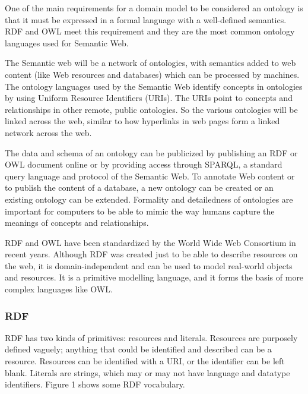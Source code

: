 \documentclass[10pt,journal,compsoc]{IEEEtran}
\begin{document}
One of the main requirements for a domain model to be considered an ontology is that it must be expressed in a formal language with a well-defined semantics.  RDF and OWL meet this requirement and they are the most common ontology languages used for Semantic Web.  

The Semantic web will be a network of ontologies, with semantics added to web content (like Web resources and databases) which can be processed by machines.  The ontology languages  used by the Semantic Web identify concepts in ontologies by using Uniform Resource Identifiers (URIs).  The URIs point to concepts and relationships in other remote, public ontologies.  So the various ontologies will be linked across the web, similar to how hyperlinks in web pages form a linked network across the web.

The data and schema of an ontology can be publicized by publishing an RDF or OWL document online or by providing access through SPARQL, a standard query language and protocol of the Semantic Web.  To annotate Web content or to publish the content of a database, a new ontology can be created or an existing ontology can be extended.  Formality and detailedness of ontologies are important for computers to be able to mimic the way humans capture the meanings of concepts and relationships.

RDF and OWL have been standardized by the World Wide Web Consortium in recent years.  Although RDF was created just to be able to describe resources on the web, it is domain-independent and can be used to model real-world objects and resources.  It is a primitive modelling language, and it forms the basis of more complex languages like OWL.



\subsubsection{RDF}
RDF has two kinds of primitives: resources and literals.  Resources are purposely defined vaguely; anything that could be identified and described can be a resource.  Resources can be identified with a URI, or the identifier can be left blank.  Literals are strings, which may or may not have language and datatype identifiers.  Figure 1 shows some RDF vocabulary.
\end{document}

